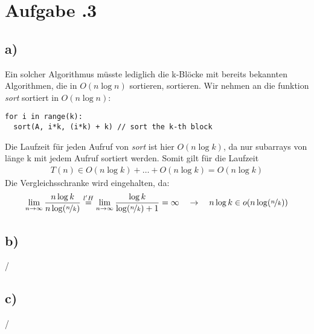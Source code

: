 \pagebreak
\section*{Aufgabe \bn.3}
\subsection*{a)}
Ein solcher Algorithmus müsste lediglich die k-Blöcke mit bereits bekannten Algorithmen, die in $O(n \log n)$ sortieren, sortieren. Wir nehmen an die funktion \emph{sort} sortiert in $ O(n \log n) $:
\begin{Verbatim}[frame=single]
for i in range(k):
  sort(A, i*k, (i*k) + k) // sort the k-th block
\end{Verbatim}
Die Laufzeit für jeden Aufruf von \emph{sort} ist hier $ O(n \log k) $, da nur subarrays von länge k mit jedem Aufruf sortiert werden. Somit gilt für die Laufzeit
\begin{align*}
  T(n) \in O(n \log k) + \ldots + O(n \log k) = O(n \log k)
\end{align*}
Die Vergleichsschranke wird eingehalten, da:
\begin{align*}
  \lim_{n\rightarrow\infty} \frac{ n\log k  }{ n\log(\nicefrac{n}{k})} \overset{l'H}{=} \lim_{n\rightarrow\infty} \frac{ \log k }{ \log(\nicefrac{n}{k})+1 } = \infty\quad \rightarrow \quad n\log k \in o(n \log (\nicefrac{n}{k})) 
\end{align*}
\subsection*{b)}
/
\subsection*{c)}
/
